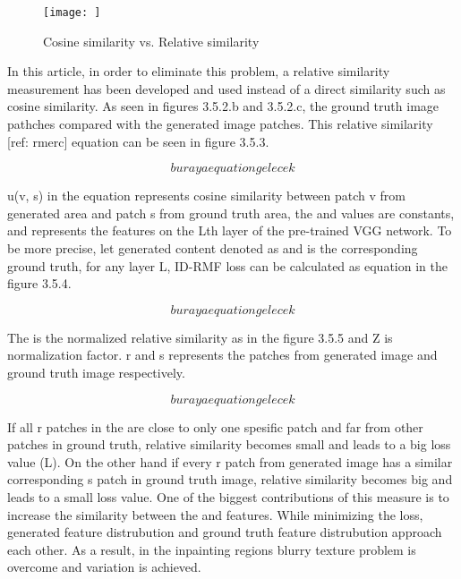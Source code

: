 \begin{figure}[h]
    \centering
    \texttt{[image: ]}
    \caption{Cosine similarity vs. Relative similarity}
    \label{fig:my_label}
\end{figure}

In this article, in order to eliminate this problem, a relative similarity measurement has been developed and used instead of a direct similarity such as cosine similarity. As seen in figures 3.5.2.b and 3.5.2.c, the ground truth image pathches compared with the generated image patches. This relative similarity [ref: rmerc] equation can be seen in figure 3.5.3.

\begin{equation}
    buraya equation gelecek
\end{equation}

u(v, s) in the equation represents cosine similarity between patch v from generated area and patch s from ground truth area, the  and  values are constants, and  represents the features on the Lth layer of the pre-trained VGG network. To be more precise, let generated content denoted as  and  is the corresponding ground truth, for any layer L, ID-RMF loss can be calculated as equation in the figure 3.5.4.

\begin{equation}
    buraya equation gelecek
\end{equation}

The  is the normalized relative similarity as in the figure 3.5.5 and Z is normalization factor. r and s represents the patches from generated image and ground truth image respectively.

\begin{equation}
    buraya equation gelecek
\end{equation}

If all r patches in the  are close to only one spesific patch and far from other patches in ground truth, relative similarity becomes small and leads to a big loss value (L). On the other hand if every r patch from generated image has a similar corresponding s patch in ground truth image, relative similarity becomes big and leads to a small loss value. One of the biggest contributions of this measure is to increase the similarity between the  and  features. While minimizing the loss, generated feature distrubution and ground truth feature distrubution approach each other. As a result, in the inpainting regions blurry texture problem is overcome and variation is achieved.

